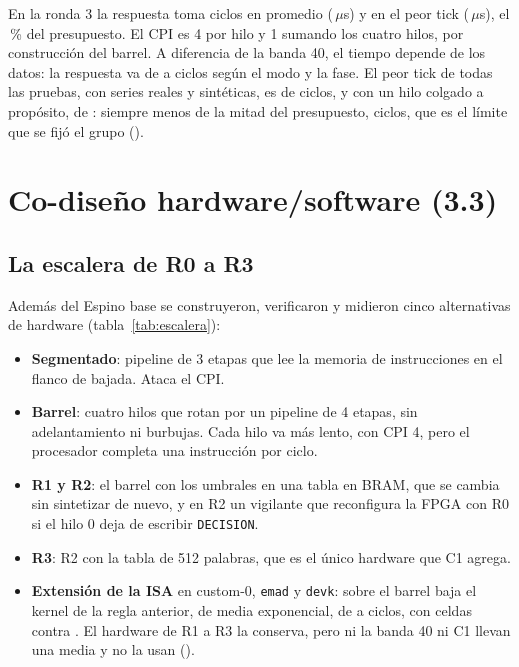 En la ronda 3 la respuesta toma \ctresRespProm{} ciclos en promedio (\ctresRespPromUs\,$\mu$s) y \ctresRespPeor{} en el peor tick (\ctresRespPeorUs\,$\mu$s), el \ctresUsoPresupuesto\,\% del presupuesto. El CPI es 4 por hilo y 1 sumando los cuatro hilos, por construcción del barrel. A diferencia de la banda 40, el tiempo depende de los datos: la respuesta va de \ctresRespMin{} a \ctresRespPeor{} ciclos según el modo y la fase. El peor tick de todas las pruebas, con \ctresGemeloReales{} series reales y \ctresSinteticasGemelo{} sintéticas, es de \ctresPeorPuertas{} ciclos, y con un hilo colgado a propósito, de \ctresPeorColgado: siempre menos de la mitad del presupuesto, \ctresLimiteGrupo{} ciclos, que es el límite que se fijó el grupo ().

\section{Co-diseño hardware/software (3.3)}

\subsection{La escalera de R0 a R3}

Además del Espino base se construyeron, verificaron y midieron cinco alternativas de hardware (tabla~\ref{tab:escalera}):
\begin{itemize}
  \item \textbf{Segmentado}: pipeline de 3 etapas que lee la memoria de instrucciones en el flanco de bajada. Ataca el CPI.
  \item \textbf{Barrel}: cuatro hilos que rotan por un pipeline de 4 etapas, sin adelantamiento ni burbujas. Cada hilo va más lento, con CPI 4, pero el procesador completa una instrucción por ciclo.
  \item \textbf{R1 y R2}: el barrel con los umbrales en una tabla en BRAM, que se cambia sin sintetizar de nuevo, y en R2 un vigilante que reconfigura la FPGA con R0 si el hilo 0 deja de escribir \texttt{DECISION}.
  \item \textbf{R3}: R2 con la tabla de 512 palabras, que es el único hardware que C1 agrega.
  \item \textbf{Extensión de la ISA} en custom-0, \texttt{emad} y \texttt{devk}: sobre el barrel baja el kernel de la regla anterior, de media exponencial, de \pSieteAmdahlCiclosPredKernelBarrel{} a \pSieteAmdahlCiclosPredKernelXdSobreBarrel{} ciclos, con \pSieteCeldasBarrelXd{} celdas contra \pSieteCeldasBarrel. El hardware de R1 a R3 la conserva, pero ni la banda 40 ni C1 llevan una media y no la usan ().
\end{itemize}

